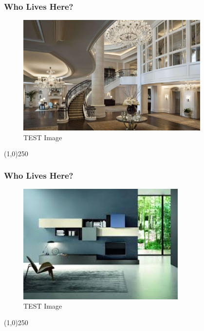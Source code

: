 \begin{frame}
\frametitle{Who Lives Here?}
\begin{figure}
	\centering
		\includegraphics[height=6cm]{img/B.jpg}
	\caption{TEST Image}
	\label{fig:lightingtypes}
\end{figure}
\end{frame}
\begin{center}\line(1,0){250}\end{center}



\begin{frame}
\frametitle{Who Lives Here?}
\begin{figure}
	\centering
		\includegraphics[height=6cm]{img/C.jpg}
	\caption{TEST Image}
	\label{fig:lightingtypes}
\end{figure}
\end{frame}
\begin{center}\line(1,0){250}\end{center}



